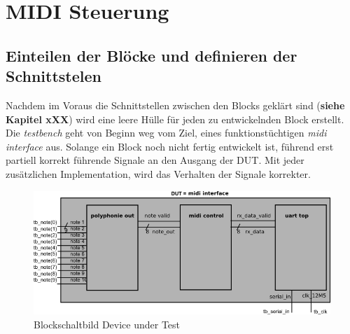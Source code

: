 
\chapter{MIDI Steuerung}\label{chap.midi}

\section{Einteilen der Blöcke und definieren der Schnittstelen}

Nachdem im Voraus die Schnittstellen zwischen den Blocks geklärt sind (\textbf{siehe Kapitel xXX}) wird eine leere Hülle für jeden zu entwickelnden Block erstellt. Die \textit{testbench} geht von Beginn weg vom Ziel, eines funktionstüchtigen \textit{midi interface} aus. Solange ein Block noch nicht fertig entwickelt ist, führend erst partiell korrekt führende Signale an den Ausgang der DUT. Mit jeder zusätzlichen Implementation, wird das Verhalten der Signale korrekter.\\

\begin{figure}[H]
	\centering
	\includegraphics[width=1\textwidth]{images/midi_interface/testbench_midiinterface.png}
	\caption{Blockschaltbild Device under Test}
	\label{fig.testbench}
\end{figure}

